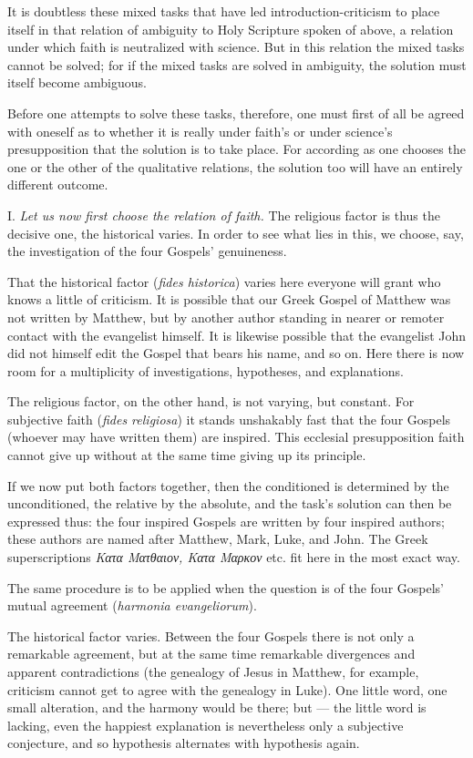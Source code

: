 \documentclass[12pt,a4paper]{book}
\begin{document}
It is doubtless these mixed tasks that have led introduction-criticism to place
itself in that relation of ambiguity to Holy Scripture spoken of above, a relation
under which faith is neutralized with science. But in this relation the mixed
tasks cannot be solved; for if the mixed tasks are solved in ambiguity, the
solution must itself become ambiguous.

Before one attempts to solve these tasks, therefore, one must first of all be
agreed with oneself as to whether it is really under faith's or under science's
presupposition that the solution is to take place. For according as one chooses
the one or the other of the qualitative relations, the solution too will have an
entirely different outcome.

I. \emph{Let us now first choose the relation of faith.} The religious factor is
thus the decisive one, the historical varies. In order to see what lies in this,
we choose, say, the investigation of the four Gospels' genuineness.

That the historical factor (\textit{fides historica}) varies here everyone will
grant who knows a little of criticism. It is possible that our Greek Gospel of
Matthew was not written by Matthew, but by another author standing in nearer or
remoter contact with the evangelist himself. It is likewise possible that the
evangelist John did not himself edit the Gospel that bears his name, and so on.
Here there is now room for a multiplicity of investigations, hypotheses, and
explanations.

The religious factor, on the other hand, is not varying, but constant. For
subjective faith (\textit{fides religiosa}) it stands unshakably fast that the
four Gospels (whoever may have written them) are inspired. This ecclesial
presupposition faith cannot give up without at the same time giving up its
principle.

If we now put both factors together, then the conditioned is determined by the
unconditioned, the relative by the absolute, and the task's solution can then be
expressed thus: the four inspired Gospels are written by four inspired authors;
these authors are named after Matthew, Mark, Luke, and John. The Greek
superscriptions \textit{Κατα Ματθαιον, Κατα Μαρκον} etc. fit here in the most
exact way.

The same procedure is to be applied when the question is of the four Gospels'
mutual agreement (\textit{harmonia evangeliorum}).

The historical factor varies. Between the four Gospels there is not only a
remarkable agreement, but at the same time remarkable divergences and apparent
contradictions (the genealogy of Jesus in Matthew, for example, criticism cannot
get to agree with the genealogy in Luke). One little word, one small alteration,
and the harmony would be there; but --- the little word is lacking, even the
happiest explanation is nevertheless only a subjective conjecture, and so
hypothesis alternates with hypothesis again.
\end{document}
